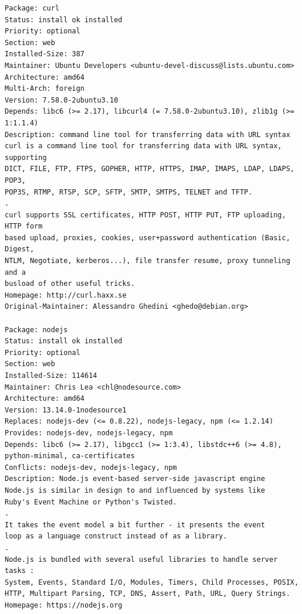 \documentclass[12pt,vi]{mitthesis}
\begin{document}
\begin{lstlisting}[style=BashInputStyle]
Package: curl
Status: install ok installed
Priority: optional
Section: web
Installed-Size: 387
Maintainer: Ubuntu Developers <ubuntu-devel-discuss@lists.ubuntu.com>
Architecture: amd64
Multi-Arch: foreign
Version: 7.58.0-2ubuntu3.10
Depends: libc6 (>= 2.17), libcurl4 (= 7.58.0-2ubuntu3.10), zlib1g (>= 1:1.1.4)
Description: command line tool for transferring data with URL syntax
curl is a command line tool for transferring data with URL syntax, supporting
DICT, FILE, FTP, FTPS, GOPHER, HTTP, HTTPS, IMAP, IMAPS, LDAP, LDAPS, POP3,
POP3S, RTMP, RTSP, SCP, SFTP, SMTP, SMTPS, TELNET and TFTP.
.
curl supports SSL certificates, HTTP POST, HTTP PUT, FTP uploading, HTTP form
based upload, proxies, cookies, user+password authentication (Basic, Digest,
NTLM, Negotiate, kerberos...), file transfer resume, proxy tunneling and a
busload of other useful tricks.
Homepage: http://curl.haxx.se
Original-Maintainer: Alessandro Ghedini <ghedo@debian.org>

Package: nodejs
Status: install ok installed
Priority: optional
Section: web
Installed-Size: 114614
Maintainer: Chris Lea <chl@nodesource.com>
Architecture: amd64
Version: 13.14.0-1nodesource1
Replaces: nodejs-dev (<= 0.8.22), nodejs-legacy, npm (<= 1.2.14)
Provides: nodejs-dev, nodejs-legacy, npm
Depends: libc6 (>= 2.17), libgcc1 (>= 1:3.4), libstdc++6 (>= 4.8), python-minimal, ca-certificates
Conflicts: nodejs-dev, nodejs-legacy, npm
Description: Node.js event-based server-side javascript engine
Node.js is similar in design to and influenced by systems like
Ruby's Event Machine or Python's Twisted.
.
It takes the event model a bit further - it presents the event
loop as a language construct instead of as a library.
.
Node.js is bundled with several useful libraries to handle server tasks :
System, Events, Standard I/O, Modules, Timers, Child Processes, POSIX,
HTTP, Multipart Parsing, TCP, DNS, Assert, Path, URL, Query Strings.
Homepage: https://nodejs.org


\end{lstlisting}
\end{document}
